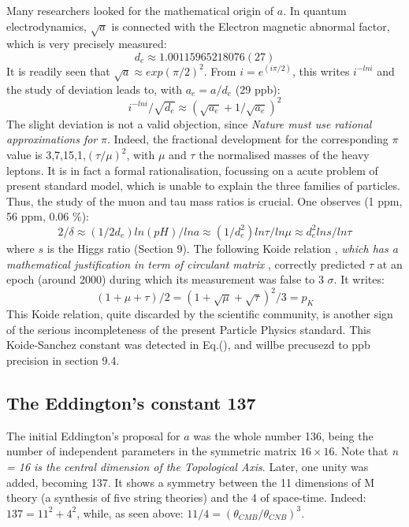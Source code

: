 \documentclass[twoside,draft]{article}
\begin{document}
\begin{sloppypar}
Many researchers looked for the mathematical origin of $a$. In quantum electrodynamics, $\sqrt{a}$ is connected with the Electron magnetic abnormal factor, which is very precisely measured\cite{Tanabashi}: $$d_e \approx 1.00115965218076(27)$$
It is readily seen that $\sqrt{a} \approx exp(\pi /2)^2$. From $i = e^{(i\pi /2)}$, this writes $i^{-lni}$ and the study of deviation leads to, with $a_e = a/d_e$ (29 ppb):
\begin{equation}
i^{-lni}/\sqrt{d_e} \approx (\sqrt{a_e} + 1/\sqrt{a_e})^2    
\end{equation}
The slight deviation is not a valid objection, since \textit{Nature must use rational approximations for} $\pi$. Indeed, the fractional development for the corresponding $\pi$ value is 3,7,15,1,$(\tau/\mu)^2$, with $\mu$ and $\tau$ the normalised masses of the heavy leptons. It is in fact a formal rationalisation, focussing on a acute problem of present standard model, which is unable to explain the three families of particles. Thus, the study of the muon and tau mass ratios is crucial. One observes (1 ppm, 56 ppm, 0.06 \%):
\begin{equation}
2/\delta \approx (1/2d_{e}) ln(pH)/lna \approx (1/d_e^{2})ln\tau/ln\mu\approx d_e^2 lns/ln\tau
\end{equation}
where $s$ is the Higgs ratio (Section 9).
The following Koide relation \cite{Koide}, \textit{ which has a mathematical justification in term of circulant matrix} \cite{Brannen}, correctly predicted $\tau$ at an epoch (around 2000) during which its measurement was false to 3 $\sigma$. It writes:
\begin{equation}
(1 + \mu + \tau)/2 = (1 + \sqrt\mu + \sqrt\tau)^2/3 = p_K
\end{equation}
This Koide relation, quite discarded by the scientific community, is another sign of the serious incompleteness of the present Particle Physics standard.
This Koide-Sanchez constant was detected in Eq.(), and willbe precusezd to ppb precision in section 9.4.

\subsection{The Eddington's constant 137}

The initial Eddington's proposal for $a$ was the whole number 136, being the number of independent parameters in the symmetric matrix $16 \times 16$. Note that \textit{n = 16 is the central dimension of the Topological Axis}. Later, one unity was added, becoming 137\cite{Eddington}. It shows a symmetry between the 11 dimensions of M theory (a synthesis of five string theories) and the 4 of space-time. Indeed: $137 = 11^{2} + 4^{2}$, while, as seen above: $11/4 = (\theta_{CMB}/\theta_{CNB})^{3}$.


\end{sloppypar}
\end{document}
